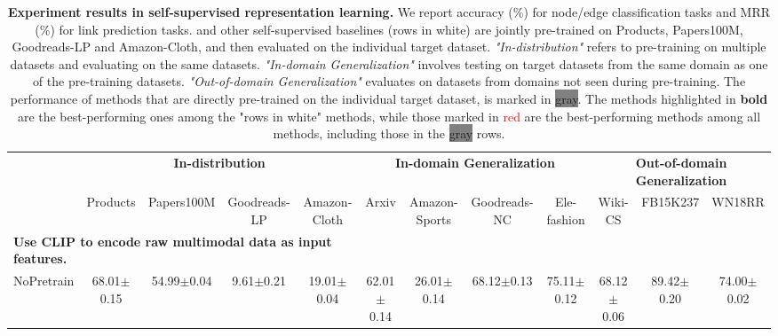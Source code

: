 \begin{table*}[t]\footnotesize
    \centering
    \renewcommand\tabcolsep{2.7pt}
    \caption{\textbf{Experiment results in self-supervised representation learning.} We report accuracy (\%) for node/edge classification tasks and MRR (\%) for link prediction tasks. \model and other self-supervised baselines (rows in white) are jointly pre-trained on Products, Papers100M, Goodreads-LP and Amazon-Cloth, and then evaluated on the individual target dataset. \textit{"In-distribution"} refers to pre-training on multiple datasets and evaluating on the same datasets. \textit{"In-domain Generalization"} involves testing on target datasets from the same domain as one of the pre-training datasets. \textit{"Out-of-domain Generalization"} evaluates on datasets from domains not seen during pre-training. The performance of methods that are directly pre-trained on the individual target dataset, is marked in \colorbox{Gray}{gray}. The methods highlighted in \textbf{bold} are the best-performing ones among the "rows in white" methods, while those marked in \textcolor{red}{red} are the best-performing methods among all methods, including those in the \colorbox{Gray}{gray} rows.
    }
    \vskip -0.10in
    \label{tab:ssrl}
    \begin{tabular}{lccccccccccc}
    \toprule[1.1pt]
    & \multicolumn{4}{c}{\textbf{In-distribution}} & \multicolumn{4}{c}{\textbf{In-domain Generalization}}& \multicolumn{3}{c}{\textbf{Out-of-domain Generalization}}\\
    \cmidrule(lr){2-5}\cmidrule(lr){6-9}\cmidrule(lr){10-12}
         & Products & Papers100M & Goodreads-LP & Amazon-Cloth & Arxiv & Amazon-Sports & Goodreads-NC & Ele-fashion & Wiki-CS & FB15K237 & WN18RR \\
    \midrule
    \multicolumn{5}{l}{\textbf{Use CLIP to encode raw multimodal data as input features.}} \\ 
    NoPretrain & 68.01{\footnotesize$\pm$0.15} & 54.99{\footnotesize$\pm$0.04} & 9.61{\footnotesize$\pm$0.21}& 19.01{\footnotesize$\pm$0.04} & 62.01{\footnotesize$\pm$0.14} & 26.01{\footnotesize$\pm$0.14} & 68.12{\footnotesize$\pm$0.13} & 75.11{\footnotesize$\pm$0.12} & 68.12{\footnotesize$\pm$0.06} & 89.42{\footnotesize$\pm$0.20} & 74.00{\footnotesize$\pm$0.02}\\

\end{tabular}
\end{table*}
